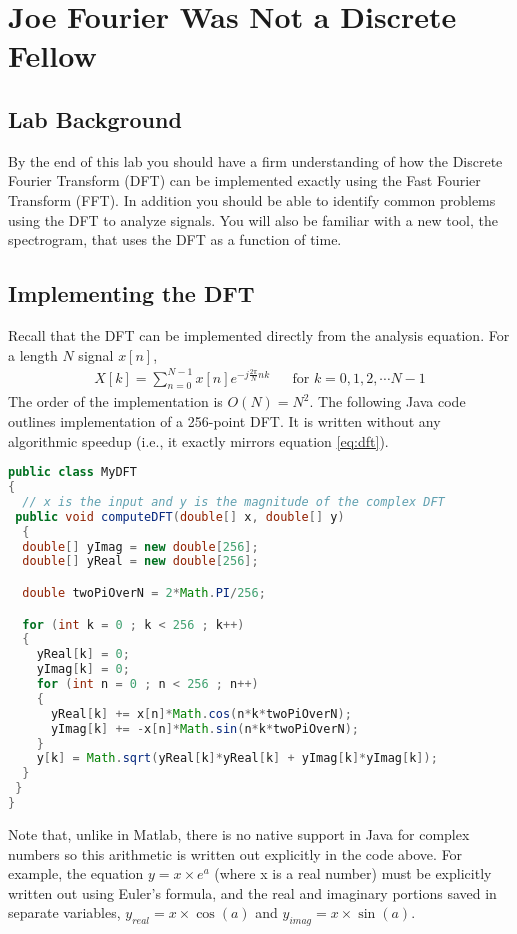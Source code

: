 
\section{Joe Fourier Was Not a Discrete Fellow}

\subsection{Lab Background}
By the end of this lab you should have a firm understanding of how the
Discrete Fourier Transform (DFT) can be implemented exactly using the
Fast Fourier Transform (FFT). In addition you should be able to
identify common problems using the DFT to analyze signals. You will
also be familiar with a new tool, the spectrogram, that uses the DFT
as a function of time.

\subsection{Implementing the DFT}

Recall that the DFT can be implemented directly from the analysis
equation. For a length $N$ signal $x[n]$,
\begin{align}
X[k]=\sum_{n=0}^{N-1}x[n]e^{-j \frac{2\pi}{N} nk} && \text{for $k = 0, 1, 2, \cdots N-1$}
\label{eq:dft}
\end{align}
The order of the implementation is $O(N)=N^2$. The following Java code
outlines implementation of a 256-point DFT. It is written without any
algorithmic speedup (i.e., it exactly mirrors equation \ref{eq:dft}).
\begin{lstlisting}[language=Java,basicstyle=\mlttfamily\small]
public class MyDFT
{
  // x is the input and y is the magnitude of the complex DFT
 public void computeDFT(double[] x, double[] y)
  {
  double[] yImag = new double[256];
  double[] yReal = new double[256];

  double twoPiOverN = 2*Math.PI/256;

  for (int k = 0 ; k < 256 ; k++)
  {
    yReal[k] = 0;
    yImag[k] = 0;
    for (int n = 0 ; n < 256 ; n++)
    {
      yReal[k] += x[n]*Math.cos(n*k*twoPiOverN);
      yImag[k] += -x[n]*Math.sin(n*k*twoPiOverN);
    }
    y[k] = Math.sqrt(yReal[k]*yReal[k] + yImag[k]*yImag[k]);
  }
 }
}
\end{lstlisting}

Note that, unlike in Matlab, there is no native support in Java for
complex numbers so this arithmetic is written out explicitly in the
code above. For example, the equation $y=x\times e^{a}$ (where x is a
real number) must be explicitly written out using Euler's formula, and
the real and imaginary portions saved in separate variables,
$y_{real}=x\times \cos(a)$ and $y_{imag}=x\times \sin(a)$.

